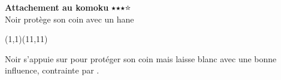 \documentclass[preview, border=0pt, varwidth=false]{standalone}
\begin{document}
	\setgounit{0.6cm} 
	
\parbox[c][14.65cm][c]{10.2cm}{
	\centering
	
	{\Large\textbf{Attachement au komoku} 	$\medblackstar \medblackstar \medblackstar \medwhitestar$ \\ Noir protège son coin avec un hane}
	\vspace{3em}
	
	\begin{psgopartialboard}{(1,1)(11,11)}
		\pass
	\end{psgopartialboard}
	
	\vspace{1em}
	Noir s'appuie sur  pour protéger son coin mais laisse blanc avec une bonne influence, contrainte par .}
\end{document}
